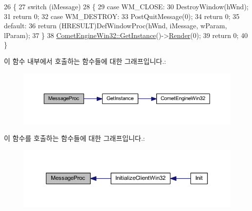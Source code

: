 \begin{DoxyCode}
26 \{
27     \textcolor{keywordflow}{switch} (iMessage)
28     \{
29     \textcolor{keywordflow}{case} WM\_CLOSE:
30         DestroyWindow(hWnd);
31         \textcolor{keywordflow}{return} 0;
32     \textcolor{keywordflow}{case} WM\_DESTROY:
33         PostQuitMessage(0);
34         \textcolor{keywordflow}{return} 0;
35     \textcolor{keywordflow}{default}:
36         \textcolor{keywordflow}{return} (HRESULT)DefWindowProc(hWnd, iMessage, wParam, lParam);
37     \}
38     \hyperlink{class_comet_engine_1_1_comet_engine_win32_af96d04b2fa84467a5342e290690e40fb}{CometEngineWin32::GetInstance}()->\hyperlink{class_comet_engine_1_1_comet_engine_win32_a805efc6c9b43dd5daa64e3c1392d18b3}{Render}(0);
39     \textcolor{keywordflow}{return} 0;
40 \}
\end{DoxyCode}
이 함수 내부에서 호출하는 함수들에 대한 그래프입니다.\+:\nopagebreak
\begin{figure}[H]
\begin{center}
\leavevmode
\includegraphics[width=350pt]{class_comet_engine_1_1_comet_engine_win32_a69f7f5121282027943c96964bb85ef85_cgraph}
\end{center}
\end{figure}
이 함수를 호출하는 함수들에 대한 그래프입니다.\+:\nopagebreak
\begin{figure}[H]
\begin{center}
\leavevmode
\includegraphics[width=350pt]{class_comet_engine_1_1_comet_engine_win32_a69f7f5121282027943c96964bb85ef85_icgraph}
\end{center}
\end{figure}
\mbox{\label{class_comet_engine_1_1_comet_engine_win32_a5ceefb272acf4d0adb4964ec29e5996e}} 
